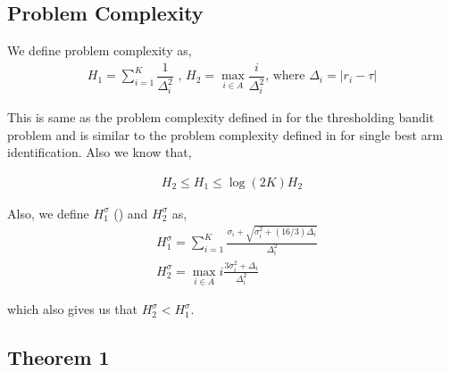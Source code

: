 

\subsection{Problem Complexity}

We define problem complexity as,
\begin{align*}
H_{1} = \sum_{i=1}^{K}\dfrac{1}{\Delta_{i}^{2}} \text{ ,   } H_{2}=\max_{i\in A}\dfrac{i}{{\Delta_{i}^{2}}} \text{, where } \Delta_{i}=|r_{i}-\tau|
\end{align*}

This is same as the problem complexity defined in \cite{locatelli2016optimal} for the thresholding bandit problem and is similar to the problem complexity defined in \cite{audibert2010best} for single best arm identification. Also we know that,

\begin{align*}
H_{2}\leq H_{1}\leq \log(2K)H_{2}
\end{align*}

Also, we define $H_{1}^{\sigma}$ (\cite{gabillon2011multi}) and $H_{2}^{\sigma}$ as,
\begin{align*}
& H_{1}^{\sigma}=\sum_{i=1}^{K}\frac{\sigma_{i}+\sqrt{\sigma_{i}^{2}+(16/3)\Delta_{i}}}{\Delta_{i}^{2}}\\
& H_{2}^{\sigma}=\max_{i\in A} i\frac{3\sigma_{i}^{2} + \Delta_i}{\Delta_i^{2}}
\end{align*}


which also gives us that $H_{2}^{\sigma} < H_{1}^{\sigma}$.


\subsection{Theorem 1}


